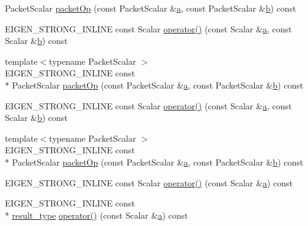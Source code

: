 \begin{DoxyCompactItemize}
Packet\-Scalar \hyperlink{struct_e_i_g_e_n___e_m_p_t_y___s_t_r_u_c_t_a1ac7c1e846531dc24381f972d7cef1e5}{packet\-Op} (const Packet\-Scalar \&\hyperlink{glext_8h_ac8729153468b5dcf13f971b21d84d4e5}{a}, const Packet\-Scalar \&\hyperlink{glext_8h_a6eba317e3cf44d6d26c04a5a8f197dcb}{b}) const 
\item 
E\-I\-G\-E\-N\-\_\-\-S\-T\-R\-O\-N\-G\-\_\-\-I\-N\-L\-I\-N\-E const Scalar \hyperlink{struct_e_i_g_e_n___e_m_p_t_y___s_t_r_u_c_t_a9800a6fef6baf202e8d4d1075d615149}{operator()} (const Scalar \&\hyperlink{glext_8h_ac8729153468b5dcf13f971b21d84d4e5}{a}, const Scalar \&\hyperlink{glext_8h_a6eba317e3cf44d6d26c04a5a8f197dcb}{b}) const 
\item 
{\footnotesize template$<$typename Packet\-Scalar $>$ }\\E\-I\-G\-E\-N\-\_\-\-S\-T\-R\-O\-N\-G\-\_\-\-I\-N\-L\-I\-N\-E const \\*
Packet\-Scalar \hyperlink{struct_e_i_g_e_n___e_m_p_t_y___s_t_r_u_c_t_a1ac7c1e846531dc24381f972d7cef1e5}{packet\-Op} (const Packet\-Scalar \&\hyperlink{glext_8h_ac8729153468b5dcf13f971b21d84d4e5}{a}, const Packet\-Scalar \&\hyperlink{glext_8h_a6eba317e3cf44d6d26c04a5a8f197dcb}{b}) const 
\item 
E\-I\-G\-E\-N\-\_\-\-S\-T\-R\-O\-N\-G\-\_\-\-I\-N\-L\-I\-N\-E const Scalar \hyperlink{struct_e_i_g_e_n___e_m_p_t_y___s_t_r_u_c_t_a9800a6fef6baf202e8d4d1075d615149}{operator()} (const Scalar \&\hyperlink{glext_8h_ac8729153468b5dcf13f971b21d84d4e5}{a}, const Scalar \&\hyperlink{glext_8h_a6eba317e3cf44d6d26c04a5a8f197dcb}{b}) const 
\item 
{\footnotesize template$<$typename Packet\-Scalar $>$ }\\E\-I\-G\-E\-N\-\_\-\-S\-T\-R\-O\-N\-G\-\_\-\-I\-N\-L\-I\-N\-E const \\*
Packet\-Scalar \hyperlink{struct_e_i_g_e_n___e_m_p_t_y___s_t_r_u_c_t_a1ac7c1e846531dc24381f972d7cef1e5}{packet\-Op} (const Packet\-Scalar \&\hyperlink{glext_8h_ac8729153468b5dcf13f971b21d84d4e5}{a}, const Packet\-Scalar \&\hyperlink{glext_8h_a6eba317e3cf44d6d26c04a5a8f197dcb}{b}) const 
\item 
E\-I\-G\-E\-N\-\_\-\-S\-T\-R\-O\-N\-G\-\_\-\-I\-N\-L\-I\-N\-E const Scalar \hyperlink{struct_e_i_g_e_n___e_m_p_t_y___s_t_r_u_c_t_a1e4ade9f4624b72ae44dc006194c5306}{operator()} (const Scalar \&\hyperlink{glext_8h_ac8729153468b5dcf13f971b21d84d4e5}{a}) const 
\item 
E\-I\-G\-E\-N\-\_\-\-S\-T\-R\-O\-N\-G\-\_\-\-I\-N\-L\-I\-N\-E const \\*
\hyperlink{struct_e_i_g_e_n___e_m_p_t_y___s_t_r_u_c_t_a99f2ce1c1dfd4e7ff53eadc336c7816e}{result\-\_\-type} \hyperlink{struct_e_i_g_e_n___e_m_p_t_y___s_t_r_u_c_t_a12e31e631e2352868d139bfda0bce554}{operator()} (const Scalar \&\hyperlink{glext_8h_ac8729153468b5dcf13f971b21d84d4e5}{a}) const 

\end{DoxyCompactItemize}
